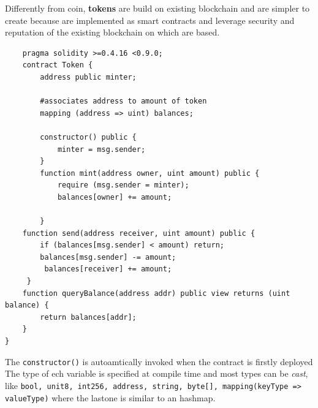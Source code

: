 \documentclass[10pt,a4paper]{report}
\begin{document}
Differently from coin, \textbf{tokens} are build on existing blockchain and are simpler to create because are implemented as smart contracts and leverage security and reputation of the existing blockchain on which are based.

\begin{lstlisting}
	pragma solidity >=0.4.16 <0.9.0; 
	contract Token { 
		address public minter; 
		
		#associates address to amount of token
		mapping (address => uint) balances; 
		
		constructor() public { 
			minter = msg.sender; 
		}
		function mint(address owner, uint amount) public { 
			require (msg.sender = minter); 
			balances[owner] += amount; 
		
		} 
	function send(address receiver, uint amount) public { 
		if (balances[msg.sender] < amount) return; 
		balances[msg.sender] -= amount;
		 balances[receiver] += amount; 
	 } 
 	function queryBalance(address addr) public view returns (uint balance) { 
 		return balances[addr];
 	} 
}
\end{lstlisting}

The \texttt{constructor()} is autoamtically invoked when the contract is firstly deployed
The type of ech variable is specified at compile time and most types can be \textit{cast}, like \texttt{bool, unit8, int256, address, string, byte[], mapping(keyType => valueType)} where the lastone is similar to an hashmap.
\end{document}
